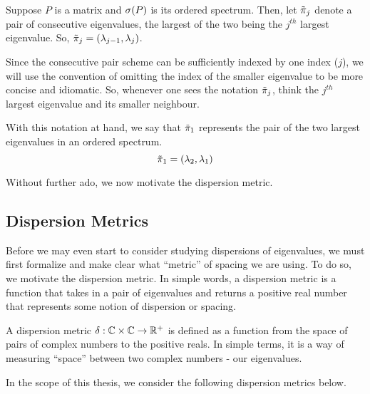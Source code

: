 \begin{definition}
Suppose $P$ is a matrix and $\sigma(P)$ is its ordered spectrum. Then, let ${\tilde{\pi}}_j$ denote a pair of consecutive eigenvalues, the largest of the two being the $j^{th}$ largest eigenvalue.
So, ${\tilde{\pi}}_j = (\lambda_{j-1},\lambda_{j})$.
\end{definition}

Since the consecutive pair scheme can be sufficiently indexed by one index ($j$), we will use the convention of omitting the index of the smaller eigenvalue to be more concise and idiomatic.
So, whenever one sees the notation ${\tilde{\pi}}_j$, think the $j^{th}$ largest eigenvalue and its smaller neighbour.

\begin{example}
With this notation at hand, we say that ${\tilde{\pi}}_1$ represents the pair of the two largest eigenvalues in an ordered spectrum.
$${\tilde{\pi}}_1 = (\lambda_2,\lambda_1)$$
\end{example}

\noindent Without further ado, we now motivate the dispersion metric.


\subsection{Dispersion Metrics}

Before we may even start to consider studying dispersions of eigenvalues, we must first formalize and make clear what ``metric'' of spacing we are using. To do so, we motivate the dispersion metric.
In simple words, a dispersion metric is a function that takes in a pair of eigenvalues and returns a positive real number that represents some notion of dispersion or spacing.

\begin{definition}
A dispersion metric $\delta: \mathbb{C} \times \mathbb{C} \to \mathbb{R}^+$ is defined as a function from the space of pairs of complex numbers to the positive reals.
In simple terms, it is a way of measuring ``space'' between two complex numbers - our eigenvalues.
\end{definition}


In the scope of this thesis, we consider the following dispersion metrics below.

